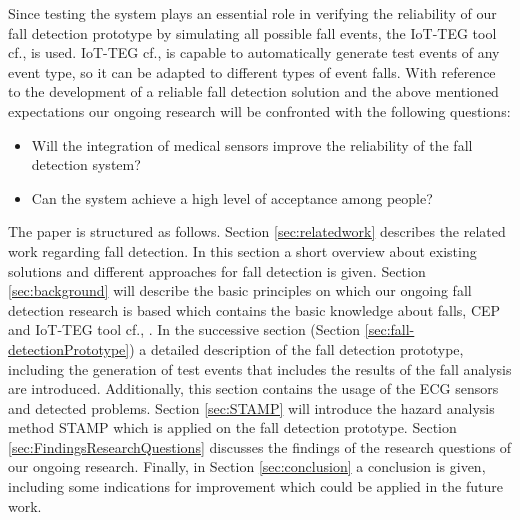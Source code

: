\documentclass[10pt,journal,compsoc]{IEEEtran}
\begin{document}
Since testing the system plays an essential role in verifying the reliability of our fall detection prototype by simulating all possible fall events, the IoT-TEG tool cf.\cite{LorenaFall}, \cite{Gutierrez2017,TesisGutierrez2017} is used. IoT-TEG cf.\cite{LorenaFall}, \cite{Gutierrez2017,TesisGutierrez2017} is capable to automatically generate test events of any event type, so it can be adapted to different types of event falls.
With reference to the development of a reliable fall detection solution and the above mentioned expectations our ongoing research will be confronted with the following questions:
\begin{itemize}
	\item Will the integration of medical sensors improve the reliability of the fall detection system?
	\item Can the system achieve a high level of acceptance among people?	
\end{itemize}
The paper is structured as follows. Section \ref{sec:relatedwork} describes the related work regarding fall detection. In this section a short overview about existing solutions and different approaches for fall detection is given. Section \ref{sec:background} will describe the basic principles on which our ongoing fall detection research is based which contains the basic knowledge about falls, CEP \cite{Esper:2016} and IoT-TEG tool cf.\cite{LorenaFall}, \cite{Gutierrez2017, TesisGutierrez2017}. In the successive section (Section \ref{sec:fall-detectionPrototype}) a detailed description of the fall detection prototype, including the generation of test events that includes the results of the fall analysis are introduced. Additionally, this section contains the usage of the ECG sensors and detected problems. Section \ref{sec:STAMP} will introduce the hazard analysis method STAMP \cite{leveson2011engineering} which is applied on the fall detection prototype. Section \ref{sec:FindingsResearchQuestions} discusses the findings of the research questions of our ongoing research. Finally, in Section \ref{sec:conclusion} a conclusion is given, including some indications for improvement which could be applied in the future work.

 
\end{document}

